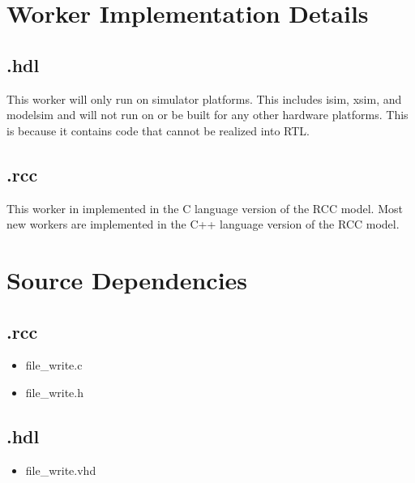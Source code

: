 \section*{Worker Implementation Details}
\subsection*{\comp.hdl}
\begin{flushleft}
This worker will only run on simulator platforms.  This includes isim, xsim, and modelsim and will not run on or be built for any other hardware platforms.  This is because it contains code that cannot be realized into RTL.
\end{flushleft}
\subsection*{\comp.rcc}
\begin{flushleft}
This worker in implemented in the C language version of the RCC model.  Most new workers are implemented in the C++ language version of the RCC model.
\end{flushleft}
\newpage
\section*{Source Dependencies}
\subsection*{\comp.rcc}
\begin{itemize}
\item file\_write.c
\item file\_write.h
\end{itemize}
\subsection*{\comp.hdl}
\begin{itemize}
\item file\_write.vhd
\end{itemize}


